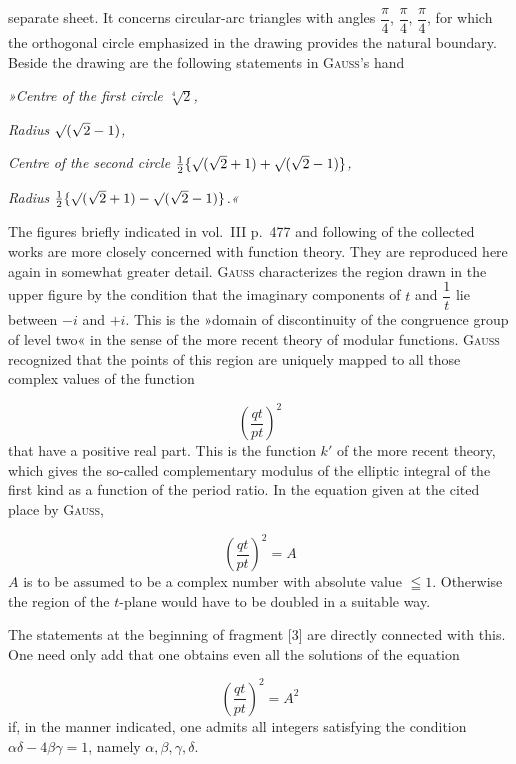 \noindent separate sheet. It concerns circular-arc triangles with angles $\dfrac{\pi}{4}$, $\dfrac{\pi}{4}$, $\dfrac{\pi}{4}$, for which the orthogonal circle emphasized in the drawing provides the natural boundary. Beside the drawing are the following statements in \textsc{Gauss}'s hand

\emph{»Centre of the first circle $\sqrt[4]{2}$,}

\emph{Radius $\mathord{\surd}(\sqrt{2}-1)$,}

\emph{Centre of the second circle $\frac12\{\mathord{\surd}(\sqrt2+1)+\mathord{\surd}(\sqrt2-1)\}$,}

\emph{Radius $\frac12\{\mathord{\surd}(\sqrt2+1)-\mathord{\surd}(\sqrt2-1)\}$.«}

The figures briefly indicated in vol.~III p.~477 and following of the collected works are more closely concerned with function theory. They are reproduced here again in somewhat greater detail. \textsc{Gauss} characterizes the region drawn in the upper figure by the condition that the imaginary components of $t$ and $\dfrac1t$ lie between $-i$ and $+i$. This is the »domain of discontinuity of the congruence group of level two« in the sense of the more recent theory of modular functions. \textsc{Gauss} recognized that the points of this region are uniquely mapped to all those complex values of the function

\begin{center}\resizebox{8.3cm}{!}{}\end{center}

\[
\left(\frac{qt}{pt}\right)^{2}
\]
that have a positive real part. This is the function $k'$ of the more recent theory, which gives the so-called complementary modulus of the elliptic integral of the first kind as a function of the period ratio. In the equation given at the cited place by \textsc{Gauss},

\[
\left(\frac{qt}{pt}\right)^{2} = A
\]
$A$ is to be as\-sumed to be a complex number with absolute value $\leqq 1$. Otherwise the region of the $t$-plane would have to be doubled in a suitable way.

The statements at the beginning of fragment [3] are directly connected with this. One need only add that one obtains even all the solutions of the equation

\[
\left(\frac{qt}{pt}\right)^{2} = A^{2}
\]
if, in the manner indicated, one admits all integers satisfying the condition $\alpha\delta - 4\beta\gamma = 1$, namely $\alpha, \beta, \gamma, \delta$.

